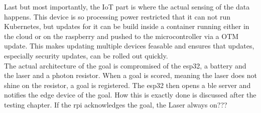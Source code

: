 Last but most importantly, the IoT part is where the actual sensing of the data happens. This device is so processing power restricted that it can not run Kubernetes, but updates for it can be build inside a container running either in the cloud or on the raspberry and pushed to the microcontroller via a OTM update. This makes updating multiple devices feasable and ensures that updates, especially security updates, can be rolled out quickly.\\
The actual architecture of the goal is compromised of the esp32, a battery and the laser and a photon resistor. When a goal is scored, meaning the laser does not shine on the resistor, a goal is registered. The esp32 then opens a ble server and notifies the edge device of the goal. How this is exactly done is discussed after the testing chapter. If the rpi acknowledges the goal, the 
Laser always on???

